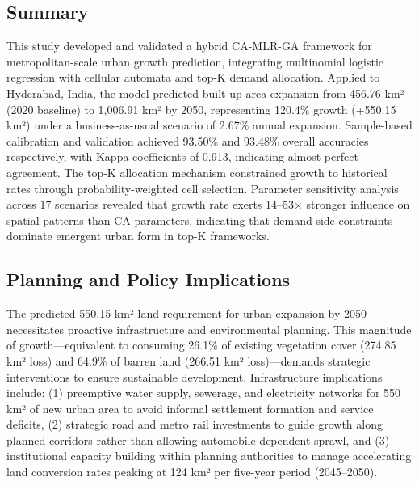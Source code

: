 \documentclass[12pt,a4paper]{article}
\begin{document}

\subsection{Summary}

This study developed and validated a hybrid CA-MLR-GA framework for metropolitan-scale urban growth prediction, integrating multinomial logistic regression with cellular automata and top-K demand allocation. Applied to Hyderabad, India, the model predicted built-up area expansion from 456.76 km² (2020 baseline) to 1,006.91 km² by 2050, representing 120.4\% growth (+550.15 km²) under a business-as-usual scenario of 2.67\% annual expansion. Sample-based calibration and validation achieved 93.50\% and 93.48\% overall accuracies respectively, with Kappa coefficients of 0.913, indicating almost perfect agreement. The top-K allocation mechanism constrained growth to historical rates through probability-weighted cell selection. Parameter sensitivity analysis across 17 scenarios revealed that growth rate exerts 14--53$\times$ stronger influence on spatial patterns than CA parameters, indicating that demand-side constraints dominate emergent urban form in top-K frameworks.

\subsection{Planning and Policy Implications}

The predicted 550.15 km² land requirement for urban expansion by 2050 necessitates proactive infrastructure and environmental planning. This magnitude of growth—equivalent to consuming 26.1\% of existing vegetation cover (274.85 km² loss) and 64.9\% of barren land (266.51 km² loss)—demands strategic interventions to ensure sustainable development. Infrastructure implications include: (1) preemptive water supply, sewerage, and electricity networks for 550 km² of new urban area to avoid informal settlement formation and service deficits, (2) strategic road and metro rail investments to guide growth along planned corridors rather than allowing automobile-dependent sprawl, and (3) institutional capacity building within planning authorities to manage accelerating land conversion rates peaking at 124 km² per five-year period (2045--2050).
\end{document}
